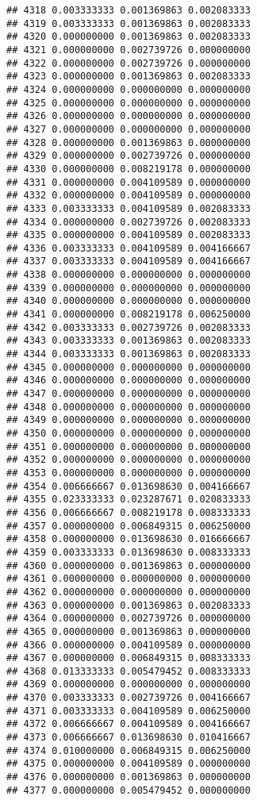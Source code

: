 \documentclass[
]{article}
\begin{document}
\begin{verbatim}
## 4318 0.003333333 0.001369863 0.002083333
## 4319 0.003333333 0.001369863 0.002083333
## 4320 0.000000000 0.001369863 0.002083333
## 4321 0.000000000 0.002739726 0.000000000
## 4322 0.000000000 0.002739726 0.000000000
## 4323 0.000000000 0.001369863 0.002083333
## 4324 0.000000000 0.000000000 0.000000000
## 4325 0.000000000 0.000000000 0.000000000
## 4326 0.000000000 0.000000000 0.000000000
## 4327 0.000000000 0.000000000 0.000000000
## 4328 0.000000000 0.001369863 0.000000000
## 4329 0.000000000 0.002739726 0.000000000
## 4330 0.000000000 0.008219178 0.000000000
## 4331 0.000000000 0.004109589 0.000000000
## 4332 0.000000000 0.004109589 0.000000000
## 4333 0.003333333 0.004109589 0.002083333
## 4334 0.000000000 0.002739726 0.002083333
## 4335 0.000000000 0.004109589 0.002083333
## 4336 0.003333333 0.004109589 0.004166667
## 4337 0.003333333 0.004109589 0.004166667
## 4338 0.000000000 0.000000000 0.000000000
## 4339 0.000000000 0.000000000 0.000000000
## 4340 0.000000000 0.000000000 0.000000000
## 4341 0.000000000 0.008219178 0.006250000
## 4342 0.003333333 0.002739726 0.002083333
## 4343 0.003333333 0.001369863 0.002083333
## 4344 0.003333333 0.001369863 0.002083333
## 4345 0.000000000 0.000000000 0.000000000
## 4346 0.000000000 0.000000000 0.000000000
## 4347 0.000000000 0.000000000 0.000000000
## 4348 0.000000000 0.000000000 0.000000000
## 4349 0.000000000 0.000000000 0.000000000
## 4350 0.000000000 0.000000000 0.000000000
## 4351 0.000000000 0.000000000 0.000000000
## 4352 0.000000000 0.000000000 0.000000000
## 4353 0.000000000 0.000000000 0.000000000
## 4354 0.006666667 0.013698630 0.004166667
## 4355 0.023333333 0.023287671 0.020833333
## 4356 0.006666667 0.008219178 0.008333333
## 4357 0.000000000 0.006849315 0.006250000
## 4358 0.000000000 0.013698630 0.016666667
## 4359 0.003333333 0.013698630 0.008333333
## 4360 0.000000000 0.001369863 0.000000000
## 4361 0.000000000 0.000000000 0.000000000
## 4362 0.000000000 0.000000000 0.000000000
## 4363 0.000000000 0.001369863 0.002083333
## 4364 0.000000000 0.002739726 0.000000000
## 4365 0.000000000 0.001369863 0.000000000
## 4366 0.000000000 0.004109589 0.000000000
## 4367 0.000000000 0.006849315 0.008333333
## 4368 0.013333333 0.005479452 0.008333333
## 4369 0.000000000 0.000000000 0.000000000
## 4370 0.003333333 0.002739726 0.004166667
## 4371 0.003333333 0.004109589 0.006250000
## 4372 0.006666667 0.004109589 0.004166667
## 4373 0.006666667 0.013698630 0.010416667
## 4374 0.010000000 0.006849315 0.006250000
## 4375 0.000000000 0.004109589 0.000000000
## 4376 0.000000000 0.001369863 0.000000000
## 4377 0.000000000 0.005479452 0.000000000

\end{verbatim}
\end{document}
